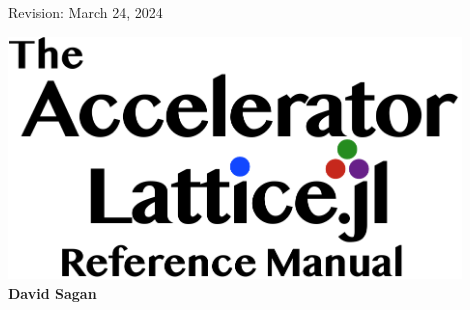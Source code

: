 
\thispagestyle{empty}

\begin{flushright}
\large
  Revision: March 24, 2024 \\
\end{flushright}


\vfill

{
\begin{center}
\includegraphics[width=12cm]{AcceleratorLattice-manual-logo.pdf} \\
\vskip 0.3in
\huge\bf David Sagan
\end{center}
}

\vfill
\break
